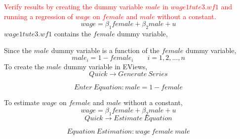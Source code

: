 \documentclass[12pt]{report}
\begin{document}
\noindent \textcolor{red}{Verify results by creating the dummy variable $male$ in $wage1tute3.wf1$ and running a regression of $wage$ on $female$ and $male$ without a constant.}
$$
wage = \beta_1female + \beta_2male + u
$$
\noindent $wage1tute3.wf1$ contains the $female$ dummy variable, 
\begin{figure}[H]
	\centering
\end{figure}
\vspace{-\baselineskip}
\begin{figure}[H]
	\centering
\end{figure}
\vspace{-\baselineskip}
\noindent Since the $male$ dummy variable is a function of the $female$ dummy variable,
$$
male_i = 1-female_i \qquad i = 1,2,\dots,n
$$
\noindent To create the $male$ dummy variable in EViews,
$$Quick \to Generate\ Series$$
\begin{figure}[H]
	\centering
\end{figure}
\vspace{-\baselineskip}
$$Enter\ Equation: male=1-female$$
\begin{figure}[H]
	\centering
\end{figure}
\vspace{-\baselineskip}
\noindent To estimate $wage$ on $female$ and $male$ without a constant, 
$$wage = \beta_1female +\beta_2male + u$$
$$Quick \to Estimate\ Equation$$
\begin{figure}[H]
	\centering
\end{figure}
\vspace{-\baselineskip}
$$Equation\ Estimation: wage\ female\ male$$
\begin{figure}[H]
	\centering
\end{figure}
\vspace{-\baselineskip}
\end{document}
